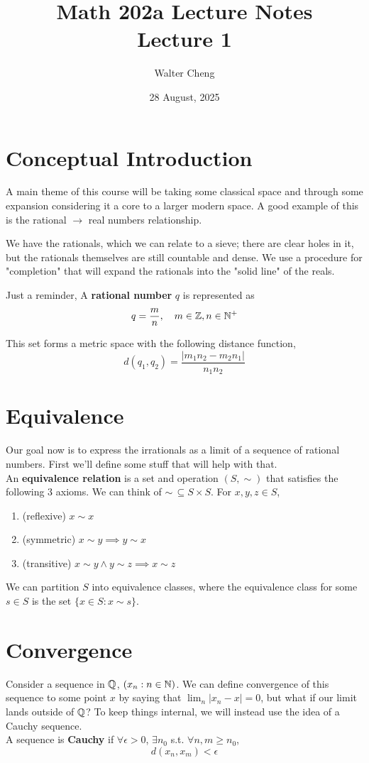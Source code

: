\documentclass[11pt]{article}
\title{Math 202a Lecture Notes\\ Lecture 1}
\date{28 August, 2025}
\author{Walter Cheng}
\begin{document}
\maketitle

\section{Conceptual Introduction}
A main theme of this course will be taking some classical space and through some expansion considering it a core to a larger modern space. A good example of this is the rational $\to$ real numbers relationship.

We have the rationals, which we can relate to a sieve; there are clear holes in it, but the rationals themselves are still countable and dense. We use a procedure for "completion" that will expand the rationals into the "solid line" of the reals.

Just a reminder,
 A \textbf{rational number} $q$ is represented as
\[q = \frac{m}{n}, \quad m \in \mathbb{Z}, n \in \mathbb{N}^+\]

This set forms a metric space with the following distance function,
\[d(q_1, q_2) = \frac{|m_1n_2 - m_2n_1|}{n_1n_2}\]

\section{Equivalence}

Our goal now is to express the irrationals as a limit of a sequence of rational numbers. First we'll define some stuff that will help with that.\\
 An \textbf{equivalence relation} is a set and operation $(S, \sim)$ that satisfies the following 3 axioms. We can think of $\sim \, \subseteq S \times S$. For $x, y, z \in S$,
\begin{enumerate}
	\item (reflexive) $x \sim x$
	\item (symmetric) $x \sim y \implies y \sim x$
	\item (transitive) $x \sim y \wedge y \sim z \implies x \sim z$
\end{enumerate}

We can partition $S$ into equivalence classes, where the equivalence class for some $s \in S$ is the set $\{x \in S : x \sim s\}$.

\section{Convergence}
Consider a sequence in $\mathbb{Q}$, $(x_n : n \in \mathbb{N})$. We can define convergence of this sequence to some point $x$ by saying that $\lim_n |x_n - x| = 0$, but what if our limit lands outside of $\mathbb{Q}$? To keep things internal, we will instead use the idea of a Cauchy sequence.\\
 A sequence is \textbf{Cauchy} if $\forall \epsilon > 0$, $\exists n_0$ s.t. $\forall n, m \geq n_0$,
\[d(x_n, x_m) < \epsilon\]
\end{document}

